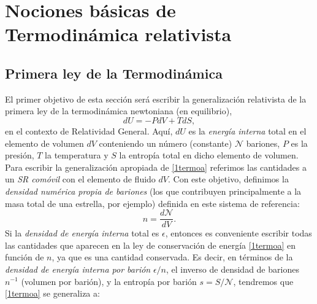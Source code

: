 \chapter[Nociones de Termodinámica]{Nociones básicas de Termodinámica relativista}\label{cap:termo}
\section{Primera ley de la Termodinámica}
El primer objetivo de esta sección será escribir la generalización relativista de la primera ley de la termodinámica newtoniana (en equilibrio),
\begin{equation}\label{1termoa}
dU=-PdV+TdS,
\end{equation}
en el contexto de Relatividad General. Aquí, $dU$ es la \textit{energía interna} total en el elemento de volumen $dV$ conteniendo un número (constante) $\mathcal{N}$ bariones, $P$ es la presión, $T$ la temperatura y $S$ la entropía total en dicho elemento de volumen. Para escribir la generalización apropiada de \eqref{1termoa} referimos las cantidades a un \textit{SR comóvil} con el elemento de fluido $dV$. Con este objetivo, definimos la \textit{densidad numérica propia de bariones} (los que contribuyen principalmente a la masa total de una estrella, por ejemplo) definida en este sistema de referencia:
\begin{equation}\label{densidadbarionica}
n=\frac{d\mathcal{N}}{dV}.
\end{equation}
Si la \textit{densidad de energía interna} total es $\epsilon$, 
entonces es conveniente escribir todas las cantidades que aparecen en la ley de conservación de energía \eqref{1termoa} en función de $n$, ya que es una cantidad conservada. Es decir, en  términos de la \textit{densidad de energía interna por barión} $\epsilon/n$, el inverso de densidad de bariones $n^{-1}$ (volumen por barión), y la entropía por barión $s=S/\mathcal{N}$, tendremos que \eqref{1termoa} se generaliza a:

